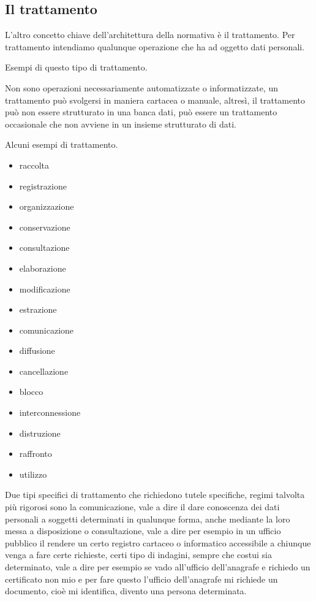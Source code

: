 \subsection{Il trattamento}
L'altro concetto chiave dell'architettura della normativa è il trattamento. Per trattamento intendiamo qualunque operazione che ha ad oggetto dati personali. 

Esempi di questo tipo di trattamento. 

Non sono operazioni necessariamente automatizzate o informatizzate, un trattamento può svolgersi in maniera cartacea o manuale, altresì, il trattamento può non essere strutturato in una banca dati, può essere un trattamento occasionale che non avviene in un insieme strutturato di dati. 

Alcuni esempi di trattamento. 

\begin{itemize}
    \item raccolta 
    \item registrazione
    \item organizzazione
    \item conservazione
    \item consultazione
    \item elaborazione
    \item modificazione
    \item estrazione
    \item comunicazione
    \item diffusione
    \item cancellazione
    \item blocco
    \item interconnessione
    \item distruzione
    \item raffronto
    \item utilizzo
\end{itemize}

Due tipi specifici di trattamento che richiedono tutele specifiche, regimi talvolta più rigorosi sono la comunicazione, vale a dire il dare conoscenza dei dati personali a soggetti determinati in qualunque forma, anche mediante la loro messa a disposizione o consultazione, vale a dire per esempio in un ufficio pubblico il rendere un certo registro cartaceo o informatico accessibile a chiunque venga a fare certe richieste, certi tipo di indagini, sempre che costui sia determinato, vale a dire per esempio se vado all'ufficio dell'anagrafe e richiedo un certificato non mio e per fare questo l'ufficio dell'anagrafe mi richiede un documento, cioè mi identifica, divento una persona determinata. 

